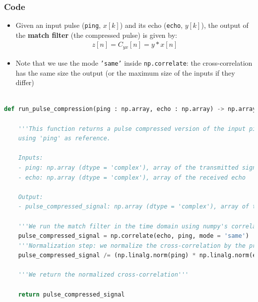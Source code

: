 \documentclass[UKenglish,8pt,aspectratio=1610]{beamer}
\begin{document}
\begin{frame}[fragile]
	\frametitle{Code}
\begin{itemize}
	\item Given an input pulse (\texttt{ping}, $x[k]$) and its echo (\texttt{echo}, $y[k]$), the output of the \textbf{match filter} (the compressed pulse) is given by:
	\begin{align*}
		z[n] = C_{yx}[n] = y \ast x[n]
	\end{align*}
	\item Note that we use the mode \texttt{'same'} inside \texttt{np.correlate}: the cross-correlation has the same size the output (or the maximum size of the inputs if they differ)
\end{itemize}
\begin{lstlisting}[language=Python, style = mystyle, caption=Pulse compression code]
	
def run_pulse_compression(ping : np.array, echo : np.array) -> np.array:

	'''This function returns a pulse compressed version of the input ping echo 
	using 'ping' as reference.
	
	Inputs:
	- ping: np.array (dtype = 'complex'), array of the transmitted signal
	- echo: np.array (dtype = 'complex'), array of the received echo
	
	Output:
	- pulse_compressed_signal: np.array (dtype = 'complex'), array of the pulse compressed singal'''
	
	'''We run the match filter in the time domain using numpy's correlate function.'''
	pulse_compressed_signal = np.correlate(echo, ping, mode = 'same')
	'''Normalization step: we normalize the cross-correlation by the product of the ping and the echo norms.'''
	pulse_compressed_signal /= (np.linalg.norm(ping) * np.linalg.norm(echo))
	
	'''We return the normalized cross-correlation'''
	
	return pulse_compressed_signal
	
\end{lstlisting}

\end{frame}
\end{document}
